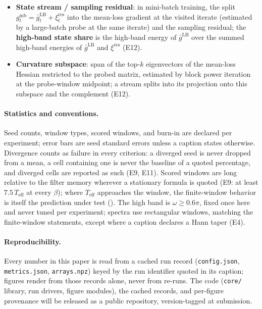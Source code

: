 \documentclass[11pt,a4paper]{article}
\theoremstyle{remark}
\newcommand{\Teff}{T_{\mathrm{eff}}}
\begin{document}
\begin{itemize}
\item \textbf{State stream / sampling residual}: in mini-batch training, the split $g^{\mathrm{mb}}_t=\bar g^{\mathrm{LB}}_t+\xi^{\mathrm{res}}_t$ into the mean-loss gradient at the visited iterate (estimated by a large-batch probe at the same iterate) and the sampling residual; the \textbf{high-band state share} is the high-band energy of $\bar g^{\mathrm{LB}}$ over the summed high-band energies of $\bar g^{\mathrm{LB}}$ and $\xi^{\mathrm{res}}$ (E12).
\item \textbf{Curvature subspace}: span of the top-$k$ eigenvectors of the mean-loss Hessian restricted to the probed matrix, estimated by block power iteration at the probe-window midpoint; a stream splits into its projection onto this subspace and the complement (E12).
\end{itemize}
\paragraph{Statistics and conventions.}
Seed counts, window types, scored windows, and burn-in are declared per experiment; error bars are seed standard errors unless a caption states otherwise.
Divergence counts as failure in every criterion: a diverged seed is never dropped from a mean, a cell containing one is never the baseline of a quoted percentage, and diverged cells are reported as such (E9, E11).
Scored windows are long relative to the filter memory wherever a stationary formula is quoted (E9: at least $7.5\,\Teff$ at every $\beta$); where $\Teff$ approaches the window, the finite-window behavior is itself the prediction under test ().
The high band is $\omega\ge0.6\pi$, fixed once here and never tuned per experiment; spectra use rectangular windows, matching the finite-window statements, except where a caption declares a Hann taper (E4).
\paragraph{Reproducibility.}
Every number in this paper is read from a cached run record (\texttt{config.json}, \texttt{metrics.json}, \texttt{arrays.npz}) keyed by the run identifier quoted in its caption; figures render from those records alone, never from re-runs.
The code (\texttt{core/} library, run drivers, figure modules), the cached records, and per-figure provenance will be released as a public repository, version-tagged at submission.
\end{document}
